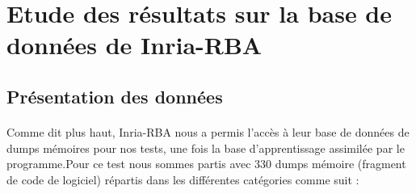 \documentclass[a4paper, 12pt]{book}
\begin{document}
% 
% 
% 

%


\newpage
\section{Etude des résultats sur la base de données de Inria-RBA}
\subsection{Présentation des données}
\paragraph{}
Comme dit plus haut, Inria-RBA nous a permis l'accès à leur base de données de dumps mémoires pour nos tests, une fois la base d'apprentissage assimilée par le programme.Pour ce test nous sommes partis avec 330 dumps mémoire (fragment de code de logiciel) répartis dans les différentes catégories comme suit :
\end{document}

